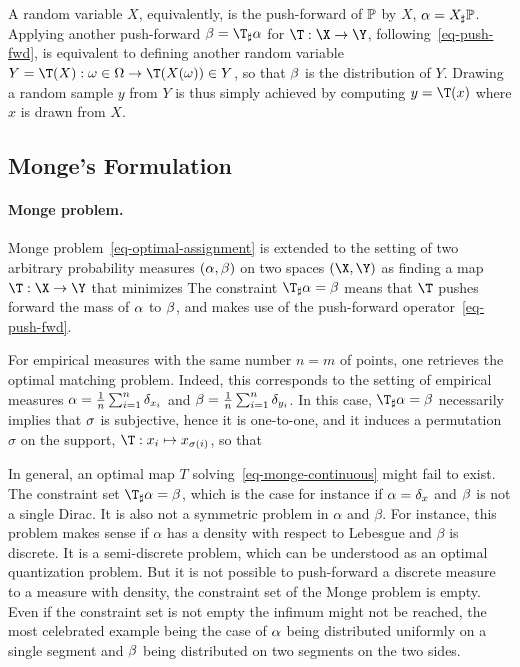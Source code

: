 \begin{rem}
A random variable $X$, equivalently, is the push-forward of $\mathbb{P}$ by $X$, $\alpha=X_\sharp\mathbb{P}$.
%
Applying another push-forward $\be = \T_\sharp\al$ for $\T : \X \rightarrow \Y$, following~\eqref{eq-push-fwd}, is equivalent to defining another random variable $Y=\T(X) : \om \in \Om \rightarrow \T(X(\om)) \in Y$, so that $\beta$ is the distribution of $Y$.
%
Drawing a random sample $y$ from $Y$ is thus simply achieved by computing $y=\T(x)$ where $x$ is drawn from $X$. 
\end{rem}


\subsection{Monge's Formulation}


\paragraph{Monge problem.}

Monge problem~\eqref{eq-optimal-assignment} is extended to the setting of two arbitrary probability measures $(\alpha,\beta)$ on two spaces $(\X,\Y)$ as finding a map $\T : \X \rightarrow \Y$ that minimizes
The constraint $\T_\sharp \al = \be$ means that $\T$ pushes forward the mass of $\alpha$ to $\beta$, and makes use of the push-forward operator~\eqref{eq-push-fwd}. 

For empirical measures with the same number $n=m$ of points, one retrieves the optimal matching problem. Indeed, this corresponds to the setting of empirical measures $\alpha=\frac{1}{n}\sum_{i=1}^n \delta_{x_i}$ and $\beta=\frac{1}{n}\sum_{i=1}^n \delta_{y_i}$. In this case, $\T_\sharp \al=\be$ necessarily implies that $\sigma$ is subjective, hence it is one-to-one, and it induces a permutation $\sigma$ on the support, $\T : x_i \mapsto x_{\si(i)}$, so that 

In general, an optimal map $T$ solving~\eqref{eq-monge-continuous} might fail to exist. The constraint set $\T_\sharp \al = \be$, which is the case for instance if $\alpha=\delta_x$ and $\beta$ is not a single Dirac. 
%
It is also not a symmetric problem in $\alpha$ and $\beta$. For instance, this problem makes sense if $\alpha$ has a density with respect to Lebesgue and $\beta$ is discrete. It is a semi-discrete problem, which can be understood as an optimal quantization problem. But it is not possible to push-forward a discrete measure to a measure with density, the constraint set of the Monge problem is empty. 
%
Even if the constraint set is not empty the infimum might not be reached, the most celebrated example being the case of $\alpha$ being distributed uniformly on a single segment and $\beta$ being distributed on two segments on the two sides.


